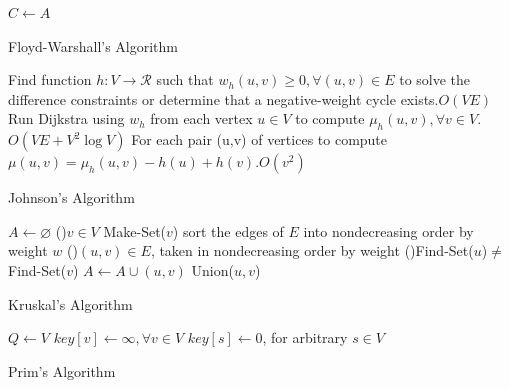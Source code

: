 \documentclass[a4paper]{article}
\begin{document}
\begin{multicols}{2}
\begin{tcolorbox}[title=All Pairs Shortest Path]
    \begin{algorithm}[H]
        \BlankLine
        $C\leftarrow A$\;
        \caption{Floyd-Warshall's Algorithm}
    \end{algorithm}
    \begin{algorithm}[H]       
        Find function $h:V\rightarrow \mathcal{R}$ such that $w_h(u,v)\geq 0, \forall (u,v)\in E$ to solve the difference constraints or determine that a negative-weight cycle exists.\quad $O(VE)$\;
        Run Dijkstra using $w_h$ from each vertex $u\in V$ to compute $\mu_h(u,v), \forall v\in V$.\quad $O(VE+V^2\log V)$\;
        For each pair (u,v) of vertices to compute $\mu(u,v)=\mu_h(u,v)-h(u)+h(v)$.\quad $O(v^2)$\;
        \caption{Johnson's Algorithm}
    \end{algorithm}
\end{tcolorbox}

\begin{tcolorbox}[title=Minimum Spanning Tree]
\begin{algorithm}[H]
    $A\leftarrow \varnothing$\;
    \ForEach(){$v\in V$}{
        Make-Set($v$)\;   
    }
    sort the edges of $E$ into nondecreasing order by weight $w$\;
    \ForEach(){$(u,v)\in E$, 
    taken in nondecreasing order by weight}{
        \If(){Find-Set($u$)$\neq$ Find-Set($v$)}{
            $A\leftarrow A\cup {(u,v)}$\;
            Union($u,v$)\;
        }
    }
    \;
    \caption{Kruskal's Algorithm}
\end{algorithm}
\begin{algorithm}[H]
    \BlankLine
    $Q\leftarrow V$\;
    $key[v]\leftarrow \infty, \forall v \in V$\;
    $key[s]\leftarrow 0$, for arbitrary $s\in V$\;
    \;
    \caption{Prim's Algorithm}
\end{algorithm}
\end{tcolorbox}



\end{multicols}
\end{document}
